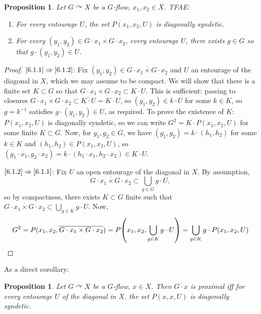 \documentclass[11pt]{article}
\newtheorem{prop}[theo]{Proposition}
\theoremstyle{definition}
\numberwithin{equation}{section}
\numberwithin{figure}{section}
\numberwithin{table}{section}
\newcommand{\actson}{\curvearrowright}
\begin{document}
\begin{prop}
Let $G\actson X$ be a $G$-flow, $x_{1}, x_{2}\in X$. TFAE:
\begin{enumerate}
\item \label{6.1.1} For every entourage $U$, the set $P(x_{1},x_{2},U)$ is diagonally syndetic.
\item \label{6.1.2} For every $(y_{1}, y_{2})\in \overline{G\cdot x_{1}\times G\cdot x_{2}}$, every entourage $U$, there exists $g\in G$ so that $g\cdot(y_{1}, y_{2})\in U$.
\end{enumerate}
\end{prop}

\begin{proof}
$\eqref{6.1.1}\Rightarrow \eqref{6.1.2}$: Fix $(y_{1}, y_{2})\in \overline{G\cdot x_{1}\times G\cdot x_{2}}$ and $U$ an entourage of the diagonal in $X$, which we may assume to be compact. We will show that there is a finite set $K\subset G$ so that $G\cdot x_{1}\times G\cdot x_{2} \subset K\cdot U$. This is sufficient: passing to closures $\overline{G\cdot x_{1}\times G\cdot x_{2}}\subset \overline{K\cdot U}=K\cdot U$, so $(y_{1}, y_{2})\in k\cdot U$ for some $k\in K$, so $g=k^{-1}$ satisfies $g\cdot(y_{1}, y_{2})\in U$, as required. To prove the existence of $K$: $P(x_{1},x_{2},U)$ is diagonally syndetic, so we can write $G^{2}=K\cdot P(x_{1},x_{2},U)$ for some finite $K\subset G$. Now, for $g_{1}, g_{2}\in G$, we have $(g_{1}, g_{2})=k\cdot(h_{1}, h_{2})$ for some $k\in K$ and $(h_{1}, h_{2})\in P(x_{1},x_{2},U)$, so $(g_{1}\cdot x_{1}, g_{2}\cdot x_{2})=k\cdot (h_{1}\cdot x_{1}, h_{2}\cdot x_{2})\in K\cdot U$.

$\eqref{6.1.2} \Rightarrow \eqref{6.1.1}$: Fix $U$ an open entourage of the diagonal in $X$. By assumption,
\[
\overline{G\cdot x_{1}\times G\cdot x_{2}}\subset \bigcup_{g\in G}g\cdot U,
\]
so by compactness, there exists $K\subset G$ finite such that $\overline{G\cdot x_{1}\times G\cdot x_{2}}\subset \bigcup_{g\in K}g\cdot U$. Now,
\begin{equation*}
G^{2}=P(x_{1}, x_{2}, \overline{G\cdot x_{1}\times G\cdot x_{2}})=P\!\left(x_{1}, x_{2}, \bigcup_{g\in K}g\cdot U\right)=\bigcup_{g\in K} g\cdot P(x_{1},x_{2},U) \qedhere
\end{equation*}
\end{proof}

As a direct corollary:

\begin{prop}\label{prop:prox}
Let $G\actson X$ be a $G$-flow, $x\in X$. Then $\overline{G\cdot x}$ is proximal iff for every entourage $U$ of the diagonal in $X$, the set $P(x,x,U)$ is diagonally syndetic.
\end{prop}
\end{document}
